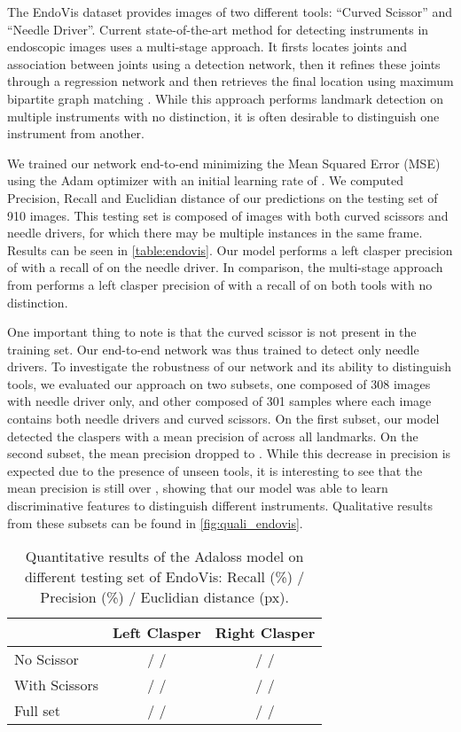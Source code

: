 \documentclass[10pt,twocolumn,letterpaper]{article}
\begin{document}
The EndoVis dataset provides
images of two different tools: ``Curved Scissor'' and ``Needle
Driver''. Current state-of-the-art method for detecting instruments in
endoscopic images uses a multi-stage approach. It firsts
locates joints and association between joints using a detection
network, then it refines these joints through a regression network and then
retrieves the final location using maximum bipartite graph matching
\cite{tmi}. While this approach performs landmark detection on
multiple instruments with no distinction, it is often desirable to
distinguish one instrument from another.  

We trained our network end-to-end minimizing the Mean Squared
Error (MSE) using the Adam optimizer \cite{kingma2015} with an initial
learning rate of . 
We computed Precision, Recall and Euclidian distance of our predictions
on the testing set of 910 images. This testing set is composed of images with both
curved scissors and needle drivers, for which there may be multiple instances in the
same frame. Results can be seen in \autoref{table:endovis}. Our model performs a
left clasper precision of  with a recall of  on the
needle driver. In comparison, the multi-stage approach from \cite{tmi} performs
a left clasper precision of  with a recall of  on both tools with no
distinction.

One important thing to note is that the curved scissor is not present in the training set.
Our end-to-end network was thus trained to detect only needle drivers. To investigate
the robustness of our network and its ability to distinguish tools, we evaluated
our approach on two subsets, one composed of 308 images with needle driver only, and other
composed of 301 samples where each image contains both needle drivers and curved scissors.
On the first subset, our model detected the claspers with a mean precision of 
across all landmarks. On the second subset, the mean precision dropped to . While
this decrease in precision is expected due to the presence of unseen tools, it is interesting
to see that the mean precision is still over , showing that our model was able to learn
discriminative features to distinguish different instruments. Qualitative results from
these subsets can be found in \autoref{fig:quali_endovis}.

\begin{table}[h]
  \centering
  \begin{tabular}{|l|c|c|}
\hline
    & Left Clasper & Right Clasper \\
    \hline
    No Scissor &  /  /  &  /  /  \\
    \hline
    With Scissors &  /  /  &  /  /  \\
    \hline
    Full set &  /  /  &  /  /  \\
    \hline
  \end{tabular}
  \caption{Quantitative results of the Adaloss model on different testing
    set of EndoVis: Recall (\%) / Precision (\%) / Euclidian distance (px).}
  \label{table:endovis}
\end{table}
  
\end{document}
